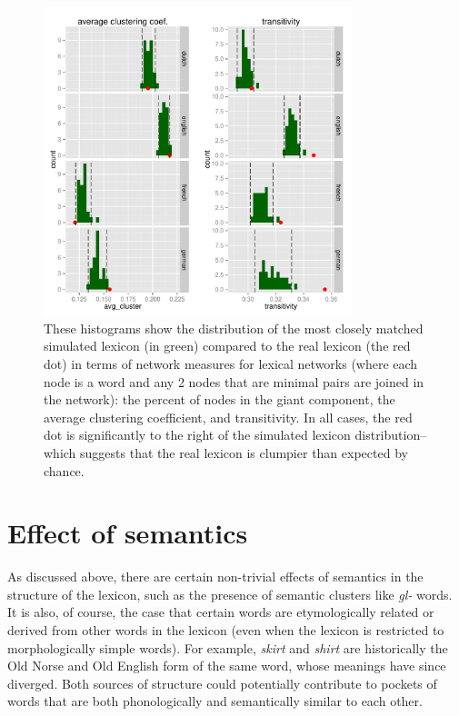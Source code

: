 \documentclass{article}
\begin{document}
\begin{figure}
\centering \includegraphics[width=0.8\textwidth]{PDFs/network.pdf}
  \caption{These histograms show the distribution of the most closely matched simulated lexicon (in green)
compared to the real lexicon (the red dot) in terms of network measures for lexical networks (where each node
is a word and any 2 nodes that are minimal pairs are joined in the network): the percent of nodes in the giant
component, the average clustering coefficient, and transitivity. In all cases, the red dot is significantly to
the right of the simulated lexicon distribution--which suggests that the real lexicon is clumpier than
expected by chance. }
  \label{3net}
\end{figure}




\section{Effect of semantics}

As discussed above, there are certain non-trivial effects of semantics in the structure of the lexicon, such
as the presence of semantic clusters like \textit{gl-} words. It is also, of course, the case that certain
words are etymologically related or derived from other words in the lexicon (even when the lexicon is
restricted to morphologically simple words). For example, \textit{skirt} and \textit{shirt} are historically
the Old Norse and Old English form of the same word, whose meanings have since diverged. Both sources of
structure could potentially contribute to pockets of words that are both phonologically and semantically
similar to each other.
\end{document}
